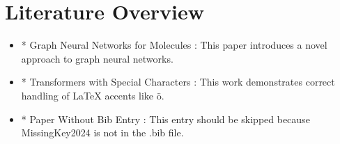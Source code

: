 \documentclass{article}
\begin{document}
\section*{Literature Overview}

\begin{itemize}
  \item * Graph Neural Networks for Molecules \cite{GraphNet2023}:
  This paper introduces a novel approach to graph neural networks.

  \item * Transformers with Special Characters \cite{Accent2022}:
  This work demonstrates correct handling of LaTeX accents like {\"o}.

  \item * Paper Without Bib Entry \cite{MissingKey2024}:
  This entry should be skipped because MissingKey2024 is not in the .bib file.
\end{itemize}
\end{document}
